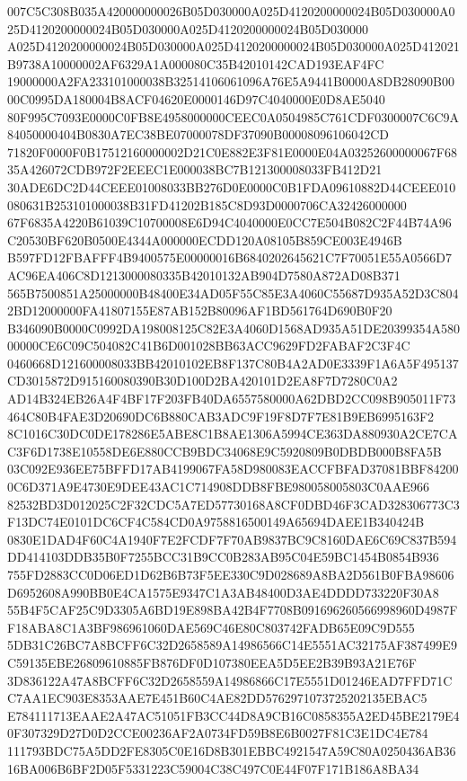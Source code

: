 \documentclass[UTF8,fontset=fandol,zihao=-4,a4paper]{ctexart}
\begin{document}
{{007C5C308B035A420000000026B05D030000A025D4120200000024B05D030000A025D4120200000024B05D030000A025D4120200000024B05D030000
A025D4120200000024B05D030000A025D4120200000024B05D030000A025D412021B9738A10000002AF6329A1A000080C35B42010142CAD193EAF4FC
19000000A2FA233101000038B32514106061096A76E5A9441B0000A8DB28090B0000C0995DA180004B8ACF04620E0000146D97C4040000E0D8AE5040
80F995C7093E0000C0FB8E4958000000CEEC0A0504985C761CDF0300007C6C9A84050000404B0830A7EC38BE07000078DF37090B00008096106042CD
71820F0000F0B17512160000002D21C0E882E3F81E0000E04A03252600000067F6835A426072CDB972F2EEEC1E000038BC7B121300008033FB412D21
30ADE6DC2D44CEEE01008033BB276D0E0000C0B1FDA09610882D44CEEE010080631B253101000038B31FD41202B185C8D93D0000706CA32426000000
67F6835A4220B61039C10700008E6D94C4040000E0CC7E504B082C2F44B74A96C20530BF620B0500E4344A000000ECDD120A08105B859CE003E4946B
B597FD12FBAFFF4B9400575E00000016B6840202645621C7F70051E55A0566D7AC96EA406C8D1213000080335B42010132AB904D7580A872AD08B371
565B7500851A25000000B48400E34AD05F55C85E3A4060C55687D935A52D3C8042BD12000000FA41807155E87AB152B80096AF1BD561764D690B0F20
B346090B0000C0992DA198008125C82E3A4060D1568AD935A51DE20399354A58000000CE6C09C504082C41B6D001028BB63ACC9629FD2FABAF2C3F4C
0460668D121600008033BB42010102EB8F137C80B4A2AD0E3339F1A6A5F495137CD3015872D915160080390B30D100D2BA420101D2EA8F7D7280C0A2
AD14B324EB26A4F4BF17F203FB40DA6557580000A62DBD2CC098B905011F73464C80B4FAE3D20690DC6B880CAB3ADC9F19F8D7F7E81B9EB6995163F2
8C1016C30DC0DE178286E5ABE8C1B8AE1306A5994CE363DA880930A2CE7CAC3F6D1738E10558DE6E880CCB9BDC34068E9C5920809B0DBDB000B8FA5B
03C092E936EE75BFFD17AB4199067FA58D980083EACCFBFAD37081BBF842000C6D371A9E4730E9DEE43AC1C714908DDB8FBE980058005803C0AAE966
82532BD3D012025C2F32CDC5A7ED57730168A8CF0DBD46F3CAD328306773C3F13DC74E0101DC6CF4C584CD0A9758816500149A65694DAEE1B340424B
0830E1DAD4F60C4A1940F7E2FCDF7F70AB9837BC9C8160DAE6C69C837B594DD414103DDB35B0F7255BCC31B9CC0B283AB95C04E59BC1454B0854B936
755FD2883CC0D06ED1D62B6B73F5EE330C9D028689A8BA2D561B0FBA98606D6952608A990BB0E4CA1575E9347C1A3AB48400D3AE4DDDD733220F30A8
55B4F5CAF25C9D3305A6BD19E898BA42B4F7708B091696260566998960D4987FF18ABA8C1A3BF986961060DAE569C46E80C803742FADB65E09C9D555
5DB31C26BC7A8BCFF6C32D2658589A14986566C14E5551AC32175AF387499E9C59135EBE26809610885FB876DF0D107380EEA5D5EE2B39B93A21E76F
3D836122A47A8BCFF6C32D2658559A14986866C17E5551D01246EAD7FFD71CC7AA1EC903E8353AAE7E451B60C4AE82DD5762971073725202135EBAC5
E784111713EAAE2A47AC51051FB3CC44D8A9CB16C0858355A2ED45BE2179E40F307329D27D0D2CCE00236AF2A0734FD59B8E6B0027F81C3E1DC4E784
111793BDC75A5DD2FE8305C0E16D8B301EBBC4921547A59C80A0250436AB3616BA006B6BF2D05F5331223C59004C38C497C0E44F07F171B186A8BA34
}}
\end{document}
